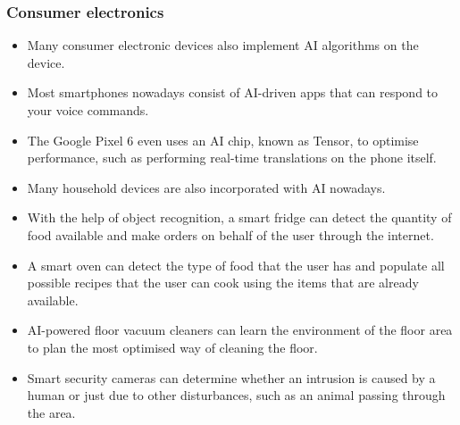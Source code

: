 \documentclass[11pt]{article}
\begin{document}
\subsubsection{Consumer electronics}
\label{sec:org422d934}
\begin{itemize}
\item Many consumer electronic devices also implement AI algorithms on the device.
\item Most smartphones nowadays consist of AI-driven apps that can respond to your voice commands.
\item The Google Pixel 6 even uses an AI chip, known as Tensor, to optimise performance, such as performing real-time translations on the phone itself.
\item Many household devices are also incorporated with AI nowadays.
\item With the help of object recognition, a smart fridge can detect the quantity of food available and make orders on behalf of the user through the internet.
\item A smart oven can detect the type of food that the user has and populate all possible recipes that the user can cook using the items that are already available.
\item AI-powered floor vacuum cleaners can learn the environment of the floor area to plan the most optimised way of cleaning the floor.
\item Smart security cameras can determine whether an intrusion is caused by a human or just due to other disturbances, such as an animal passing through the area.
\end{itemize}

\clearpage
\end{document}

